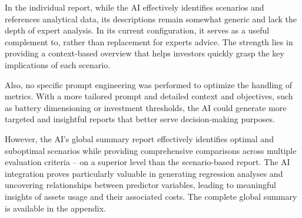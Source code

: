 In the individual report, while the AI effectively identifies scenarios and references analytical data, its descriptions 
remain somewhat generic and lack the depth of expert analysis. In its current configuration, it serves as a useful complement to, 
rather than replacement for experts advice. The strength lies in providing a context-based overview that 
helps investors quickly grasp the key implications of each scenario.

Also, no specific prompt engineering was performed to optimize the handling of metrics. With a more tailored 
prompt and detailed context and objectives, such as battery dimensioning or investment thresholds, the AI could generate
more targeted and insightful reports that better serve decision-making purposes.

However, the AI's global summary report effectively identifies optimal and suboptimal scenarios while providing 
comprehensive comparisons across multiple evaluation criteria -- on a superior level than the scenario-based report. The AI 
integration proves particularly valuable in generating regression analyses and uncovering relationships between predictor 
variables, leading to meaningful insights of assets usage and their associated costs. The complete global summary 
is available in the appendix.




